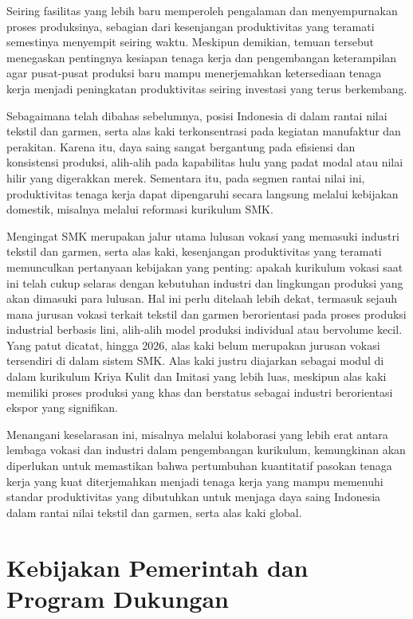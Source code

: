 \documentclass[
  manuscript=article,
  layout=publish,
  year=2026,
  volume=1,
]{den}
\begin{document}
Seiring fasilitas yang lebih baru memperoleh pengalaman dan
menyempurnakan proses produksinya, sebagian dari kesenjangan
produktivitas yang teramati semestinya menyempit seiring waktu. Meskipun
demikian, temuan tersebut menegaskan pentingnya kesiapan tenaga kerja
dan pengembangan keterampilan agar pusat-pusat produksi baru mampu
menerjemahkan ketersediaan tenaga kerja menjadi peningkatan
produktivitas seiring investasi yang terus berkembang.

Sebagaimana telah dibahas sebelumnya, posisi Indonesia di dalam rantai
nilai tekstil dan garmen, serta alas kaki terkonsentrasi pada kegiatan
manufaktur dan perakitan. Karena itu, daya saing sangat bergantung pada
efisiensi dan konsistensi produksi, alih-alih pada kapabilitas hulu yang
padat modal atau nilai hilir yang digerakkan merek. Sementara itu, pada
segmen rantai nilai ini, produktivitas tenaga kerja dapat dipengaruhi
secara langsung melalui kebijakan domestik, misalnya melalui reformasi
kurikulum SMK.

Mengingat SMK merupakan jalur utama lulusan vokasi yang memasuki
industri tekstil dan garmen, serta alas kaki, kesenjangan produktivitas
yang teramati memunculkan pertanyaan kebijakan yang penting: apakah
kurikulum vokasi saat ini telah cukup selaras dengan kebutuhan industri
dan lingkungan produksi yang akan dimasuki para lulusan. Hal ini perlu
ditelaah lebih dekat, termasuk sejauh mana jurusan vokasi terkait
tekstil dan garmen berorientasi pada proses produksi industrial berbasis
lini, alih-alih model produksi individual atau bervolume kecil. Yang
patut dicatat, hingga 2026, alas kaki belum merupakan jurusan vokasi
tersendiri di dalam sistem SMK. Alas kaki justru diajarkan sebagai modul
di dalam kurikulum Kriya Kulit dan Imitasi yang lebih luas, meskipun
alas kaki memiliki proses produksi yang khas dan berstatus sebagai
industri berorientasi ekspor yang signifikan.

Menangani keselarasan ini, misalnya melalui kolaborasi yang lebih erat
antara lembaga vokasi dan industri dalam pengembangan kurikulum,
kemungkinan akan diperlukan untuk memastikan bahwa pertumbuhan
kuantitatif pasokan tenaga kerja yang kuat diterjemahkan menjadi tenaga
kerja yang mampu memenuhi standar produktivitas yang dibutuhkan untuk
menjaga daya saing Indonesia dalam rantai nilai tekstil dan garmen,
serta alas kaki global.

\section{Kebijakan Pemerintah dan Program
Dukungan}\label{kebijakan-pemerintah-dan-program-dukungan}
\end{document}
